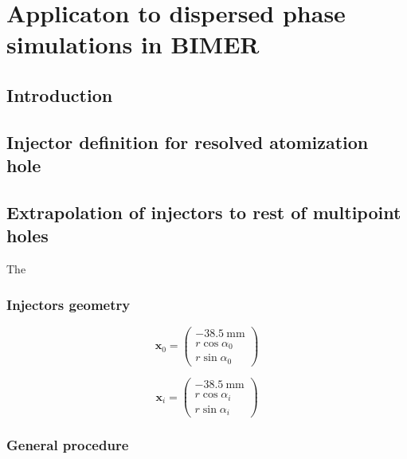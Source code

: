 \chapter{Applicaton to dispersed phase simulations in BIMER}
	\label{ch:bimer_test_bench}

\section{Introduction}

\section{Injector definition for resolved atomization hole}

\section{Extrapolation of injectors to rest of multipoint holes}

The 

\subsection{Injectors geometry}

\begin{equation}
\boldsymbol{x}_0 =  \begin{pmatrix} - 38.5 ~\mathrm{mm} \\ r \cos \alpha_0 \\ r \sin \alpha_0 \end{pmatrix}
\end{equation}

\begin{equation}
\boldsymbol{x}_i =  \begin{pmatrix} - 38.5 ~\mathrm{mm} \\ r \cos \alpha_i \\ r \sin \alpha_i \end{pmatrix}
\end{equation}


\subsection{General procedure}

